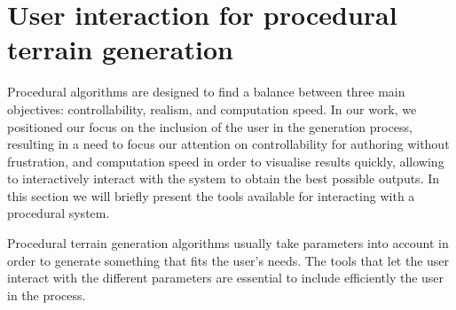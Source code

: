




\section{User interaction for procedural terrain generation}
Procedural algorithms are designed to find a balance between three main objectives: controllability, realism, and computation speed.
In our work, we positioned our focus on the inclusion of the user in the generation process, resulting in a need to focus our attention on controllability for authoring without frustration, and computation speed in order to visualise results quickly, allowing to interactively interact with the system to obtain the best possible outputs. In this section we will briefly present the tools available for interacting with a procedural system.

Procedural terrain generation algorithms usually take parameters into account in order to generate something that fits the user's needs. The tools that let the user interact with the different parameters are essential to include efficiently the user in the process.

